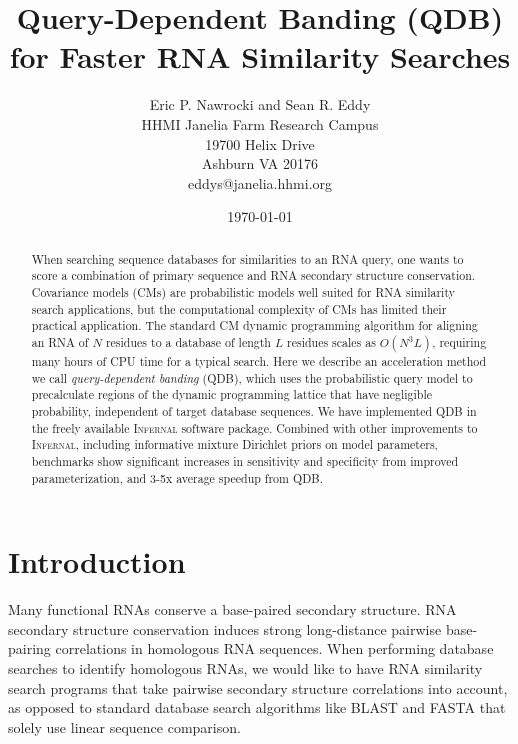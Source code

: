\documentclass[11pt]{article}
\begin{document}
\title{Query-Dependent Banding (QDB) for Faster RNA Similarity Searches}
\author{Eric P. Nawrocki and Sean R. Eddy\\
HHMI Janelia Farm Research Campus\\
19700 Helix Drive\\
Ashburn VA 20176\\
eddys@janelia.hhmi.org}  
\date{\today}
\maketitle




\begin{abstract}

When searching sequence databases for similarities to an RNA query,
one wants to score a combination of primary sequence and RNA secondary
structure conservation.  Covariance models (CMs) are probabilistic
models well suited for RNA similarity search applications, but the
computational complexity of CMs has limited their practical
application. The standard CM dynamic programming algorithm for
aligning an RNA of $N$ residues to a database of length $L$ residues
scales as $O(N^3 L)$, requiring many hours of CPU time for a typical
search. Here we describe an acceleration method we call
\emph{query-dependent banding} (QDB), which uses the probabilistic
query model to precalculate regions of the dynamic programming lattice
that have negligible probability, independent of target database
sequences. We have implemented QDB in the freely available
\textsc{Infernal} software package. Combined with other improvements
to \textsc{Infernal}, including informative mixture Dirichlet priors
on model parameters, benchmarks show significant increases in
sensitivity and specificity from improved parameterization, and 3-5x
average speedup from QDB.

\end{abstract}





\section{Introduction}

Many functional RNAs conserve a base-paired secondary structure. RNA
secondary structure conservation induces strong long-distance pairwise
base-pairing correlations in homologous RNA sequences.  When
performing database searches to identify homologous RNAs, we would
like to have RNA similarity search programs that take pairwise
secondary structure correlations into account, as opposed to standard
database search algorithms like BLAST and FASTA that solely use linear
sequence comparison.
\end{document}
